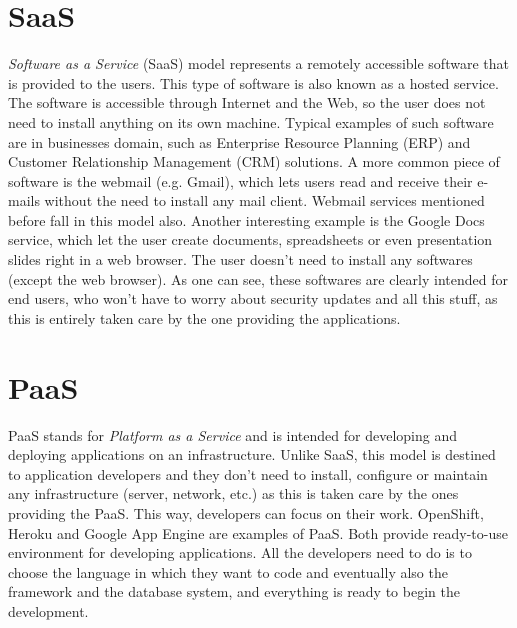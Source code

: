 \section{SaaS}
\textit{Software as a Service} (SaaS) model represents a remotely accessible software that is provided to the users. 
This type of software is also known as a hosted service. 
The software is accessible through Internet and the Web, so the user does not need to install anything on its own machine. 
Typical examples of such software are in businesses domain, such as Enterprise Resource Planning (ERP) and Customer Relationship Management (CRM) solutions. 
A more common piece of software is the webmail (e.g. Gmail), which lets users read and receive their e-mails without the need to install any mail client. 
Webmail services mentioned before fall in this model also. 
Another interesting example is the Google Docs service, which let the user create documents, spreadsheets or even presentation slides right in a web browser. 
The user doesn't need to install any softwares (except the web browser). 
As one can see, these softwares are clearly intended for end users, who won't have to worry about security updates and all this stuff, as this is entirely taken care by the one providing the applications.





\section{PaaS}
PaaS stands for \textit{Platform as a Service} and is intended for developing and deploying applications on an infrastructure. 
Unlike SaaS, this model is destined to application developers and they don't need to install, configure or maintain any infrastructure (server, network, etc.) as this is taken care by the ones providing the PaaS. 
This way, developers can focus on their work. 
OpenShift, Heroku and Google App Engine are examples of PaaS.
Both provide ready-to-use environment for developing applications.
All the developers need to do is to choose the language in which they want to code and eventually also the framework and the database system, and everything is ready to begin the development.





